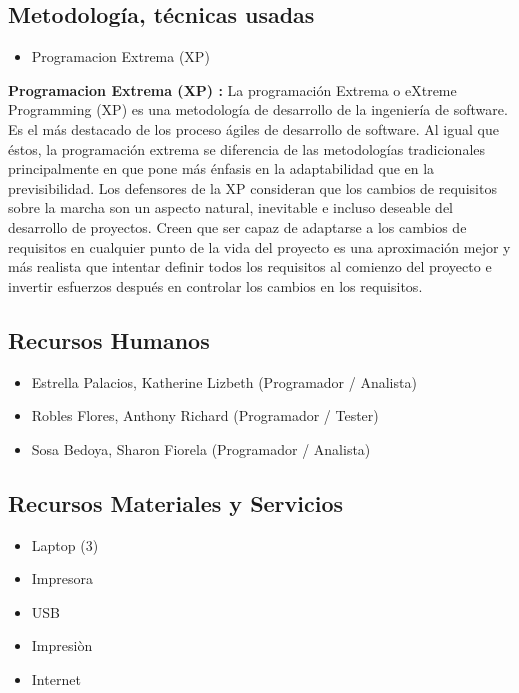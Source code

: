 \documentclass[preprint,12pt]{elsarticle}
\begin{document}
	 	
	
	
	\subsection{Metodología, técnicas usadas }	
	
	\begin{itemize}
    \item Programacion Extrema (XP) 

	\end{itemize}
	
	\textbf{Programacion Extrema (XP) :} La programación Extrema o eXtreme Programming (XP) es una metodología de desarrollo de la ingeniería de software. Es el más destacado de los proceso ágiles de desarrollo de software. Al igual que éstos, la programación extrema se diferencia de las metodologías tradicionales principalmente en que pone más énfasis en la adaptabilidad que en la previsibilidad. Los defensores de la XP consideran que los cambios de requisitos sobre la marcha son un aspecto natural, inevitable e incluso deseable del desarrollo de proyectos. Creen que ser capaz de adaptarse a los cambios de requisitos en cualquier punto de la vida del proyecto es una aproximación mejor y más realista que intentar definir todos los requisitos al comienzo del proyecto e invertir esfuerzos después en controlar los cambios en los requisitos.
		

\subsection{\textbf{Recursos Humanos}}
\begin{itemize}
	\item Estrella Palacios, Katherine Lizbeth (Programador / Analista)
	\item Robles Flores, Anthony Richard (Programador / Tester)
	\item Sosa Bedoya, Sharon Fiorela (Programador / Analista)
\end{itemize}

\subsection{\textbf{Recursos Materiales y Servicios}}
\begin{itemize}
	\item Laptop (3)
	\item Impresora
	\item USB
	\item Impresiòn
	\item Internet
\end{itemize}
	
\end{document}
